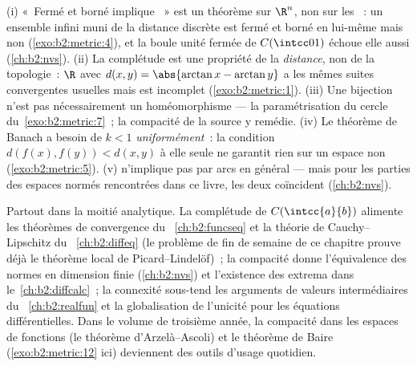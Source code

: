 \begin{remark}\label{rem:b2:metric:pitfalls}
(i) «~Fermé et borné implique ~» est un théorème sur $\R^n$,
non sur les ~: un ensemble infini muni de la
distance discrète est fermé et borné en lui-même mais non 
(\cref{exo:b2:metric:4}), et la boule unité fermée de $C(\intcc01)$
échoue elle aussi (\cref{ch:b2:nvs}). (ii) La complétude est une
propriété de la \emph{distance}, non de la topologie~: $\R$ avec
$d(x,y) = \abs{\arctan x - \arctan y}$ a les mêmes suites convergentes
usuelles mais est incomplet (\cref{exo:b2:metric:1}). (iii) Une
bijection  n'est pas nécessairement un homéomorphisme --- la
paramétrisation du cercle du~\cref{exo:b2:metric:7}~; la compacité de
la source y remédie. (iv) Le théorème de Banach a besoin de $k < 1$
\emph{uniformément}~: la condition $d(f(x), f(y)) < d(x,y)$ à elle
seule ne garantit rien sur un espace non 
(\cref{exo:b2:metric:5}). (v)  n'implique pas  par arcs
en général --- mais pour les parties  des espaces normés
rencontrées dans ce livre, les deux coïncident (\cref{ch:b2:nvs}).
\end{remark}

\begin{remark}
Partout dans la moitié analytique. La complétude de
$C(\intcc{a}{b})$ alimente les théorèmes de convergence du~%
\cref{ch:b2:funcseq} et la théorie de Cauchy--Lipschitz du~%
\cref{ch:b2:diffeq} (le problème de fin de semaine de ce chapitre
prouve déjà le théorème local de Picard--Lindelöf)~; la compacité
donne l'équivalence des normes en dimension finie (\cref{ch:b2:nvs})
et l'existence des extrema dans le~\cref{ch:b2:diffcalc}~; la
connexité sous-tend les arguments de valeurs intermédiaires du~%
\cref{ch:b2:realfun} et la globalisation de l'unicité pour les
équations différentielles. Dans le volume de troisième année, la
compacité dans les espaces de fonctions (le théorème
d'Arzelà--Ascoli) et le théorème de Baire (\cref{exo:b2:metric:12}
ici) deviennent des outils d'usage quotidien.
\end{remark}

